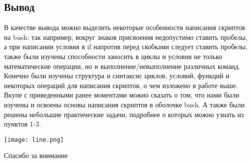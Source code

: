 \newpage
\subsection*{Вывод}
В качестве вывода можно выделить некоторые особенности написания скриптов на bush: так например, вокруг знаков присвоения недопустимо ставить пробелы, а при написании условия в if напротив перед скобками следует ставить пробелы, также были изучены способности заносить в циклы и условия не только математические операции, но и выполнение/невыполнение различных команд. Конечно были изучены структура и синтаксис циклов, условий, функций и некоторых операций для написания скриптов, о чем изложено в работе выше. \\

Вкупе с приведенными ранее моментами можно сказать о том, что нами были изучены и освоены основы написания скриптов в оболочке bush. А также были решены небольшие практические задачи, подробнее о которых можно узнать из пунктов 1-3. \\

 \begin{center}
		\texttt{[image: line.png]}
	\end{center}

 \vspace{1.5cm}
 \centerline{Спасибо за внимание}